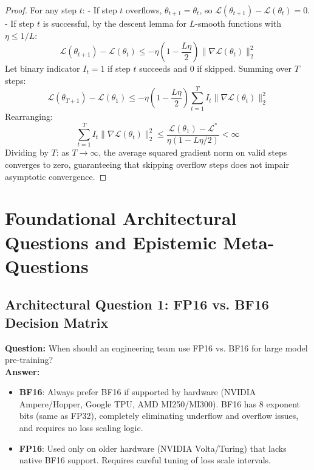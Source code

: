 \documentclass[11pt,a4paper]{article}
\theoremstyle{definition}
\begin{document}
\begin{proof}
For any step $t$:
- If step $t$ overflows, $\theta_{t+1} = \theta_t$, so $\mathcal{L}(\theta_{t+1}) - \mathcal{L}(\theta_t) = 0$.
- If step $t$ is successful, by the descent lemma for $L$-smooth functions with $\eta \le 1/L$:
{\boldmath
\begin{equation}
\mathcal{L}(\theta_{t+1}) - \mathcal{L}(\theta_t) \le - \eta \left( 1 - \frac{L \eta}{2} \right) \|\nabla \mathcal{L}(\theta_t)\|_2^2
\end{equation}
}
Let binary indicator $I_t = 1$ if step $t$ succeeds and $0$ if skipped.
Summing over $T$ steps:
{\boldmath
\begin{equation}
\mathcal{L}(\theta_{T+1}) - \mathcal{L}(\theta_1) \le - \eta \left( 1 - \frac{L \eta}{2} \right) \sum_{t=1}^T I_t \|\nabla \mathcal{L}(\theta_t)\|_2^2
\end{equation}
}
Rearranging:
{\boldmath
\begin{equation}
\sum_{t=1}^T I_t \|\nabla \mathcal{L}(\theta_t)\|_2^2 \le \frac{\mathcal{L}(\theta_1) - \mathcal{L}^*}{\eta (1 - L \eta / 2)} < \infty
\end{equation}
}
Dividing by $T$: as $T \to \infty$, the average squared gradient norm on valid steps converges to zero, guaranteeing that skipping overflow steps does not impair asymptotic convergence.
\end{proof}

\section{Foundational Architectural Questions and Epistemic Meta-Questions}

\subsection{Architectural Question 1: FP16 vs. BF16 Decision Matrix}
\textbf{Question:} When should an engineering team use FP16 vs. BF16 for large model pre-training?\\
\textbf{Answer:} 
\begin{itemize}
    \item \textbf{BF16}: Always prefer BF16 if supported by hardware (NVIDIA Ampere/Hopper, Google TPU, AMD MI250/MI300). BF16 has 8 exponent bits (same as FP32), completely eliminating underflow and overflow issues, and requires no loss scaling logic.
    \item \textbf{FP16}: Used only on older hardware (NVIDIA Volta/Turing) that lacks native BF16 support. Requires careful tuning of loss scale intervals.
\end{itemize}
\end{document}
